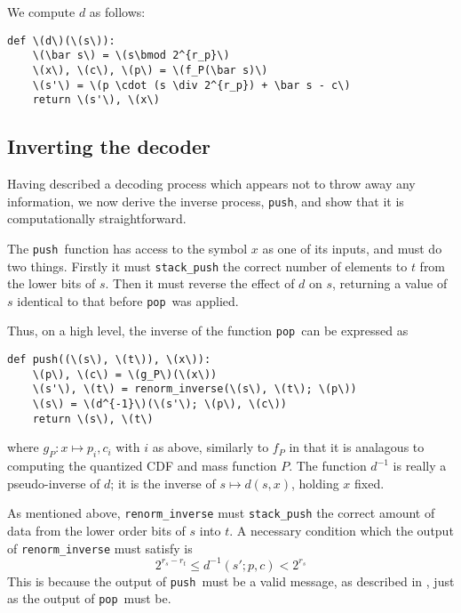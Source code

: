 \documentclass{article}
\newcommand{\push}{\texttt{push}}
\newcommand{\pop}{\texttt{pop}}
\begin{document}
We compute \(d\) as follows:
\begin{lstlisting}
def \(d\)(\(s\)):
    \(\bar s\) = \(s\bmod 2^{r_p}\)
    \(x\), \(c\), \(p\) = \(f_P(\bar s)\)
    \(s'\) = \(p \cdot (s \div 2^{r_p}) + \bar s - c\)
    return \(s'\), \(x\)
\end{lstlisting}

\subsection{Inverting the decoder}
Having described a decoding process which appears not to throw away any
information, we now derive the inverse process, \push, and show that it is
computationally straightforward.

The \push\ function has access to the symbol \(x\) as one of its inputs, and
must do two things. Firstly it must \texttt{stack\_push} the correct number of
elements to \(t\) from the lower bits of \(s\). Then it must reverse the effect
of \(d\) on \(s\), returning a value of \(s\) identical to that before \pop\
was applied.

Thus, on a high level, the inverse of the function \pop\ can be expressed as
\begin{lstlisting}
def push((\(s\), \(t\)), \(x\)):
    \(p\), \(c\) = \(g_P\)(\(x\))
    \(s'\), \(t\) = renorm_inverse(\(s\), \(t\); \(p\))
    \(s\) = \(d^{-1}\)(\(s'\); \(p\), \(c\))
    return \(s\), \(t\)
\end{lstlisting}
where \(g_P:x\mapsto p_i, c_i\) with \(i\) as above, similarly to \(f_P\) in
that it is analagous to computing the quantized CDF and mass function \(P\).
The function \(d^{-1}\) is really a pseudo-inverse of \(d\); it is the inverse
of \(s\mapsto d(s, x)\), holding \(x\) fixed.

As mentioned above, \texttt{renorm\_inverse} must \texttt{stack\_push} the
correct amount of data from the lower order bits of \(s\) into \(t\). A
necessary condition which the output of \texttt{renorm\_inverse} must satisfy
is
\begin{equation}\label{eq:renorm_inverse_ineq}
  2^{r_s - r_t} \leq d^{-1}(s'; p, c) < 2^{r_s}
\end{equation}
This is because the output of \push\ must be a valid message, as described in
\Cref{sec:message}, just as the output of \pop\ must be.
\end{document}
